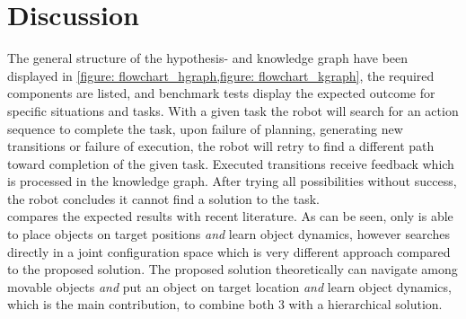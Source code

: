 





\section{Discussion}
\label{section: proposed_method_discussion}
The general structure of the hypothesis- and knowledge graph have been displayed in \cref{figure: flowchart_hgraph,figure: flowchart_kgraph}, the required components are listed, and benchmark tests display the expected outcome for specific situations and tasks. With a given task the robot will search for an action sequence to complete the task, upon failure of planning, generating new transitions or failure of execution, the robot will retry to find a different path toward completion of the given task. Executed transitions receive feedback which is processed in the knowledge graph. After trying all possibilities without success, the robot concludes it cannot find a solution to the task. \\

 compares the expected results with recent literature. As can be seen, only \cite{sabbagh_novin_model_2021} is able to place objects on target positions \textit{and} learn object dynamics, however \cite{sabbagh_novin_model_2021} searches directly in a joint configuration space which is very different approach compared to the proposed solution. The proposed solution theoretically can navigate among movable objects \textit{and} put an object on target location \textit{and} learn object dynamics, which is the main contribution, to combine both 3 with a hierarchical solution.

